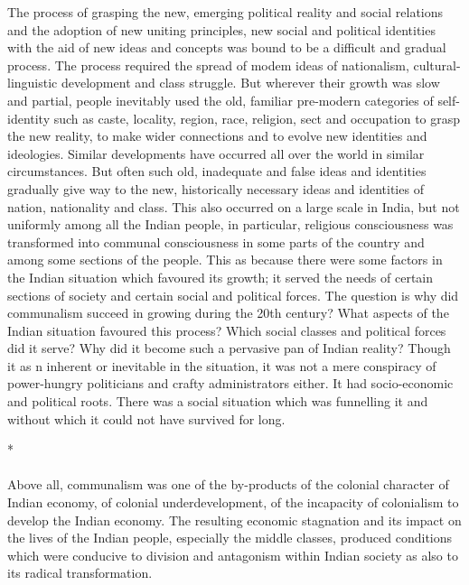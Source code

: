 \begin{multicols}{2}
The process of grasping the new, emerging political reality and social relations and the adoption of new uniting principles, new social and political identities with the aid of new ideas and concepts was bound to be a difficult and gradual process. The process required the spread of modem ideas of nationalism, cultural-linguistic development and class struggle. But wherever their growth was slow and partial, people inevitably used the old, familiar pre-modern categories of self-identity such as caste, locality, region, race, religion, sect and occupation to grasp the new reality, to make wider connections and to evolve new identities and ideologies. Similar developments have occurred all over the world in similar circumstances. But often such old, inadequate and false ideas and identities gradually give way to the new, historically necessary ideas and identities of nation, nationality and class. This also occurred on a large scale in India, but not uniformly among all the Indian people, in particular, religious consciousness was transformed into communal consciousness in some parts of the country and among some sections of the people. This as because there were some factors in the Indian situation which favoured its growth; it served the needs of certain sections of society and certain social and political forces. The question is why did communalism succeed in growing during the 20th century? What aspects of the Indian situation favoured this process? Which social classes and political forces did it serve? Why did it become such a pervasive pan of Indian reality? Though it as n inherent or inevitable in the situation, it was not a mere conspiracy of power-hungry politicians and crafty administrators either. It had socio-economic and political roots. There was a social situation which was funnelling it and without which it could not have survived for long.

\begin{center}*\end{center}

\paragraph*{}
Above all, communalism was one of the by-products of the colonial character of Indian economy, of colonial underdevelopment, of the incapacity of colonialism to develop the Indian economy. The resulting economic stagnation and its impact on the lives of the Indian people, especially the middle classes, produced conditions which were conducive to division and antagonism within Indian society as also to its radical transformation.


\end{multicols}
